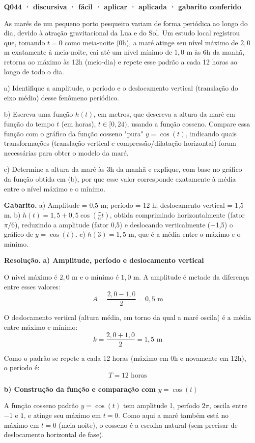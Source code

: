 \documentclass[11pt,a4paper]{article}
\begin{document}
\bigskip\noindent\textbf{Q044 · discursiva · fácil · aplicar · aplicada · gabarito conferido}\par\nopagebreak
As marés de um pequeno porto pesqueiro variam de forma periódica ao longo do dia, devido à atração gravitacional da Lua e do Sol. Um estudo local registrou que, tomando $t = 0$ como meia-noite (0h), a maré atinge seu nível máximo de $2{,}0$ m exatamente à meia-noite, cai até um nível mínimo de $1{,}0$ m às 6h da manhã, retorna ao máximo às 12h (meio-dia) e repete esse padrão a cada 12 horas ao longo de todo o dia.

a) Identifique a amplitude, o período e o deslocamento vertical (translação do eixo médio) desse fenômeno periódico.

b) Escreva uma função $h(t)$, em metros, que descreva a altura da maré em função do tempo $t$ (em horas), $t \in [0,24)$, usando a função cosseno. Compare essa função com o gráfico da função cosseno "pura" $y=\cos(t)$, indicando quais transformações (translação vertical e compressão/dilatação horizontal) foram necessárias para obter o modelo da maré.

c) Determine a altura da maré às 3h da manhã e explique, com base no gráfico da função obtida em (b), por que esse valor corresponde exatamente à média entre o nível máximo e o mínimo.

\textbf{Gabarito.} a) Amplitude = 0,5 m; período = 12 h; deslocamento vertical = 1,5 m. b) $h(t) = 1{,}5 + 0{,}5\cos\left(\frac{\pi}{6}t\right)$, obtida comprimindo horizontalmente (fator $\pi/6$), reduzindo a amplitude (fator 0,5) e deslocando verticalmente (+1,5) o gráfico de $y=\cos(t)$. c) $h(3) = 1{,}5$ m, que é a média entre o máximo e o mínimo.

\textbf{Resolução.} \textbf{a) Amplitude, período e deslocamento vertical}

O nível máximo é $2{,}0$ m e o mínimo é $1{,}0$ m. A amplitude é metade da diferença entre esses valores:
$$A = \frac{2{,}0 - 1{,}0}{2} = 0{,}5 \text{ m}$$

O deslocamento vertical (altura média, em torno da qual a maré oscila) é a média entre máximo e mínimo:
$$k = \frac{2{,}0 + 1{,}0}{2} = 1{,}5 \text{ m}$$

Como o padrão se repete a cada 12 horas (máximo em 0h e novamente em 12h), o período é:
$$T = 12 \text{ horas}$$

\textbf{b) Construção da função e comparação com $y=\cos(t)$}

A função cosseno padrão $y=\cos(t)$ tem amplitude 1, período $2\pi$, oscila entre $-1$ e $1$, e atinge seu máximo em $t=0$. Como aqui a maré também está no máximo em $t=0$ (meia-noite), o cosseno é a escolha natural (sem precisar de deslocamento horizontal de fase).
\end{document}
